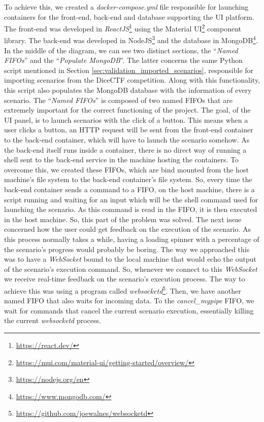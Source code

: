 To achieve this, we created a \textit{docker-compose.yml} file responsible for launching containers for the front-end, back-end and database supporting the UI platform. The front-end was developed in \textit{ReactJS}\footnote{\url{https://react.dev/}} using the Material UI\footnote{\url{https://mui.com/material-ui/getting-started/overview/}} component library. The back-end was developed in NodeJS\footnote{\url{https://nodejs.org/en}} and the database in MongoDB\footnote{\url{https://www.mongodb.com/}}. In the middle of the diagram, we can see two distinct sections, the ``\textit{Named FIFOs}'' and the ``\textit{Populate MongoDB}''. The latter concerns the same Python script mentioned in Section \ref{sec:validation_imported_scenarios}, responsible for importing scenarios from the DiceCTF competition.
Along with this functionality, this script also populates the MongoDB database with the information of every scenario. The ``\textit{Named FIFOs}'' is composed of two named FIFOs that are extremely important for the correct functioning of the project. The goal, of the UI panel, is to launch scenarios with the click of a button. This means when a user clicks a button, an HTTP request will be sent from the front-end container to the back-end container, which will have to launch the scenario somehow. As the back-end itself runs inside a container, there is no direct way of running a shell sent to the back-end service in the machine hosting the containers. To overcome this, we created these FIFOs, which are bind mounted from the host machine's file system to the back-end container's file system. So, every time the back-end container sends a command to a FIFO, on the host machine, there is a script running and waiting for an input which will be the shell command used for launching the scenario. As this command is read in the FIFO, it is then executed in the host machine. So, this part of the problem was solved. The next issue concerned how the user could get feedback on the execution of the scenario. As this process normally takes a while, having a loading spinner with a percentage of the scenario's progress would probably be boring.
The way we approached this was to have a \textit{WebSocket} bound to the local machine that would echo the output of the scenario's execution command. So, whenever we connect to this \textit{WebSocket} we receive real-time feedback on the scenario's execution process. The way to achieve this was using a program called \textit{websocketd}\footnote{\url{https://github.com/joewalnes/websocketd}}. Then, we have another named FIFO that also waits for incoming data. To the \textit{cancel\_mypipe} FIFO, we wait for commands that cancel the current scenario execution, essentially killing the current \textit{websocketd} process.

